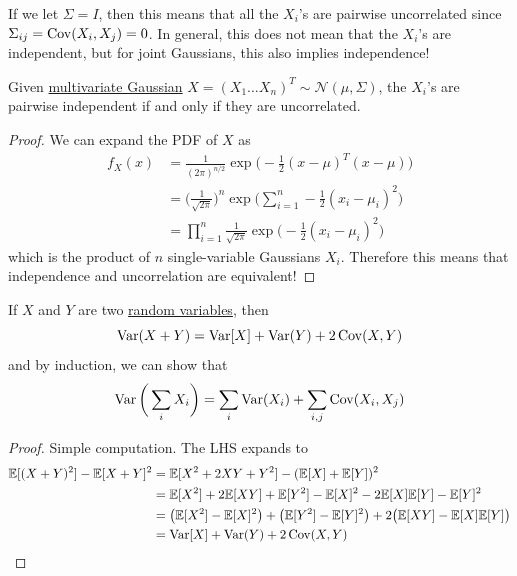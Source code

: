   If we let $\Sigma = I$, then this means that all the $X_i$'s are pairwise uncorrelated since $\Sigma_{ij} = \operatorname{Cov} (X_i, X_j) = 0$. In general, this does not mean that the $X_i$'s are independent, but for joint Gaussians, this also implies independence! 

	\begin{theorem}
	  \label{thm:uncorrelated-equals-independence-in}
		Given \hyperref[def:multivariate-gaussian]{multivariate Gaussian} $X = (X_1 \ldots X_n)^T \sim \mathcal{N}(\mu, \Sigma)$, the $X_i$'s are pairwise independent if and only if they are uncorrelated. 
  \end{theorem}
  \begin{proof}
		We can expand the PDF of $X$ as 
		\begin{align}
			f_X (x) & = \frac{1}{(2 \pi)^{n/2}} \exp \bigg( -\frac{1}{2} (x - \mu)^T (x - \mu) \bigg) \\
			& = \bigg(\frac{1}{\sqrt{2\pi}} \bigg)^n \exp \bigg( \sum_{i=1}^n -\frac{1}{2} (x_i - \mu_i)^2 \bigg) \\
			& = \prod_{i=1}^n \frac{1}{\sqrt{2\pi}} \exp \bigg( -\frac{1}{2} (x_i - \mu_i)^2 \bigg)
		\end{align}
		which is the product of $n$ single-variable Gaussians $X_i$. Therefore this means that independence and uncorrelation are equivalent! 
  \end{proof}

  \begin{theorem}
    \label{thm:variance-of-sums-of-random-variables}
    If $X$ and $Y$ are two \hyperref[def:random-variable]{random variables}, then 
    \begin{equation}
      \operatorname{Var}(X + Y) = \operatorname{Var}[X] + \operatorname{Var}(Y) + 2 \operatorname{Cov}(X, Y)
    \end{equation}
    and by induction, we can show that 
    \begin{equation}
      \operatorname{Var}\bigg( \sum_i X_i\bigg) = \sum_{i} \operatorname{Var}(X_i) + \sum_{i, j} \operatorname{Cov}(X_i, X_j)
    \end{equation}
  \end{theorem}
  \begin{proof}
    Simple computation. The LHS expands to 
    \begin{align*}
      \mathbb{E}[(X + Y)^2] - \mathbb{E}[X + Y]^2 & = \mathbb{E}[X^2 + 2XY + Y^2] - (\mathbb{E}[X] + \mathbb{E}[Y])^2 \\
      & = \mathbb{E}[X^2] + 2 \mathbb{E}[XY] + \mathbb{E}[Y^2] - \mathbb{E}[X]^2 - 2 \mathbb{E}[X] \mathbb{E}[Y] - \mathbb{E}[Y]^2 \\
      & = \big( \mathbb{E}[X^2] - \mathbb{E}[X]^2 \big) + \big( \mathbb{E}[Y^2] - \mathbb{E}[Y]^2 \big) + 2 \big( \mathbb{E}[XY] - \mathbb{E}[X] \mathbb{E}[Y] \big) \\
      & = \operatorname{Var}[X] + \operatorname{Var}(Y) + 2 \operatorname{Cov}(X, Y) 
    \end{align*}
  \end{proof}

